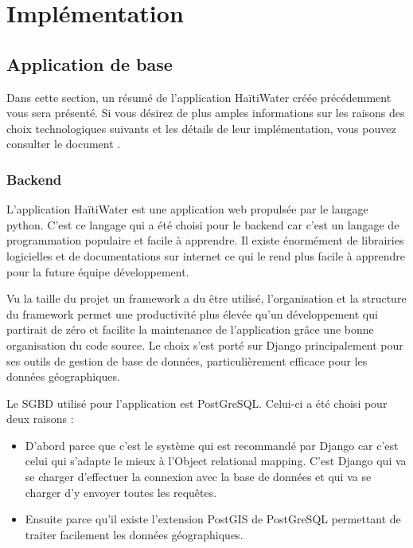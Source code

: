 \documentclass{EPL-master-thesis-covers-FR}
\begin{document}
			




	\chapter{Implémentation}

		\section{Application de base}
			Dans cette section, un résumé de l'application HaïtiWater créée précédemment vous sera présenté. Si vous désirez de plus amples informations sur les raisons des choix technologiques suivants et les détails de leur implémentation, vous pouvez consulter le document \cite{ref:haitiwater}.
			
			\subsection*{Backend}
				L'application HaïtiWater est une application web propulsée par le langage python. C'est ce langage qui a été choisi pour le backend car c'est un langage de programmation populaire et facile à apprendre. Il existe énormément de librairies logicielles et de documentations sur internet ce qui le rend plus facile à apprendre pour la future équipe développement. 
				
				Vu la taille du projet un framework a du être utilisé, l'organisation et la structure du framework permet une productivité plus élevée qu'un développement qui partirait de zéro et facilite la maintenance de l'application grâce une bonne organisation du code source. Le choix s'est porté sur Django principalement pour ses outils de gestion de base de données, particulièrement efficace pour les données géographiques.	
			
				Le SGBD utilisé pour l'application est PostGreSQL. Celui-ci a été choisi pour deux raisons :
				\begin{itemize}
					\item D'abord parce que c'est le système qui est recommandé par Django car c'est celui qui s'adapte le mieux à l'Object relational mapping. C'est Django qui va se charger d'effectuer la connexion avec la base de données et qui va se charger d'y envoyer toutes les requêtes.
					\item Ensuite parce qu'il existe l'extension PostGIS de PostGreSQL permettant de traiter facilement les données géographiques.
				\end{itemize}			
				
\end{document}
